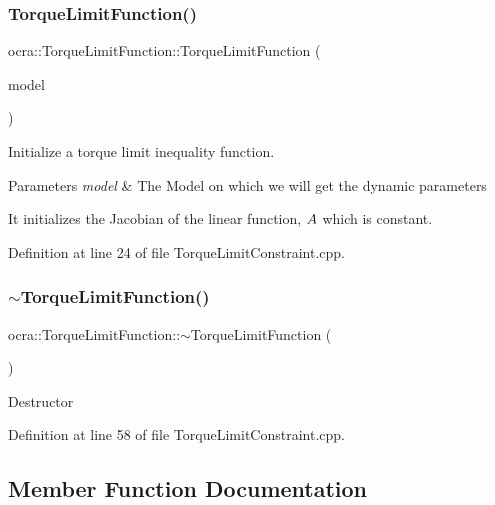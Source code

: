 \subsubsection{\texorpdfstring{Torque\+Limit\+Function()}{TorqueLimitFunction()}}
{\footnotesize\ttfamily ocra\+::\+Torque\+Limit\+Function\+::\+Torque\+Limit\+Function (\begin{DoxyParamCaption}\item[{const Model \&}]{model }\end{DoxyParamCaption})}

Initialize a torque limit inequality function.


\begin{DoxyParams}{Parameters}
{\em model} & The Model on which we will get the dynamic parameters\\
\hline
\end{DoxyParams}
It initializes the Jacobian of the linear function, $ A $ which is constant. 

Definition at line 24 of file Torque\+Limit\+Constraint.\+cpp.

\hypertarget{classocra_1_1TorqueLimitFunction_a810eb8dd094bb809859a6adf9c6c4a18}{}\label{classocra_1_1TorqueLimitFunction_a810eb8dd094bb809859a6adf9c6c4a18} 
\subsubsection{\texorpdfstring{$\sim$\+Torque\+Limit\+Function()}{~TorqueLimitFunction()}}
{\footnotesize\ttfamily ocra\+::\+Torque\+Limit\+Function\+::$\sim$\+Torque\+Limit\+Function (\begin{DoxyParamCaption}{ }\end{DoxyParamCaption})}

Destructor 

Definition at line 58 of file Torque\+Limit\+Constraint.\+cpp.



\subsection{Member Function Documentation}
\hypertarget{classocra_1_1TorqueLimitFunction_a455115a2dc26da5603bbf843bb88ef38}{}\label{classocra_1_1TorqueLimitFunction_a455115a2dc26da5603bbf843bb88ef38} 

